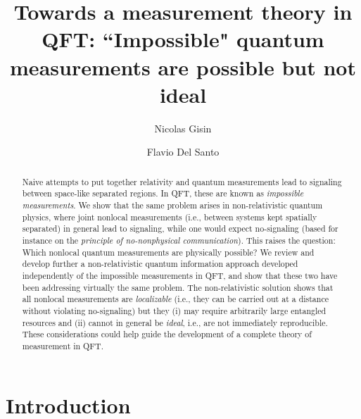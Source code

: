 \documentclass[a4paper,twocolumn,11pt,accepted=2024-02-14]{quantumarticle}
\begin{document}
\title{Towards a measurement theory in QFT: ``Impossible" quantum measurements are possible but not ideal}



\author{Nicolas Gisin}

\author{Flavio Del Santo}


\begin{abstract}
\noindent 
Naive attempts to put together relativity and quantum measurements 
lead to signaling between space-like separated regions. In QFT, these are known as \textit{impossible measurements}. We show that the same problem arises in non-relativistic quantum physics, where joint nonlocal measurements (i.e., between systems kept spatially separated) in general lead to signaling, while one would expect no-signaling (based for instance on the \textit{principle of no-nonphysical communication}). This raises the question: Which nonlocal quantum measurements are physically possible? We review and develop further a non-relativistic quantum information approach developed independently of the impossible measurements in QFT, and show that these two have been addressing virtually the same problem. The non-relativistic solution shows that all nonlocal measurements are \textit{localizable} (i.e., they can be carried out at a distance without violating no-signaling) but they (i)  may require arbitrarily large entangled resources and (ii)  cannot in general be \textit{ideal}, i.e., are not immediately reproducible. These considerations could help guide the development of a complete theory of measurement in QFT.

\end{abstract}

\maketitle



\section{Introduction}
\label{intro}
\end{document}
